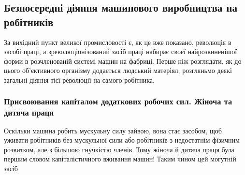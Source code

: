 \subsection{Безпосередні діяння машинового виробництва на робітників}

За вихідний пункт великої промисловості є, як це вже
показано, революція в засобі праці, а зреволюціонізований засіб
праці набирає своєї найрозвиненішої форми в розчленованій
системі машин на фабриці. Перше ніж розглядати, як до цього
об’єктивного організму додається людський матеріял, розгляньмо
деякі загальні діяння тієї революції на самого робітника.

\subsubsection{Присвоювання капіталом додаткових робочих
сил. Жіноча та дитяча праця}

Оскільки машина робить мускульну силу зайвою, вона стає
засобом, щоб уживати робітників без мускульної сили або робітників
з недостатнім фізичним розвитком, але з більшою гнучкістю
членів. Тому жіноча й дитяча праця була першим словом капіталістичного
вживання машин! Таким чином цей могутній засіб
\parbreak{}  %

